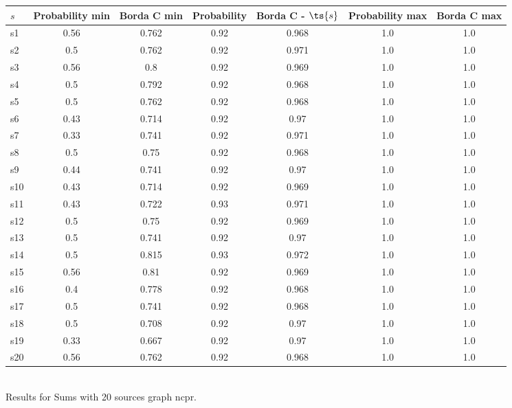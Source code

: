 \documentclass{article}
\begin{document}
\noindent\begin{tabular}{|l|c|c|c|c|c|c|}
\hline
$s$& Probability min & Borda C min & Probability & Borda C - $\ts{s}$ & Probability max & Borda C max\\
\hline
s1 &0.56 & 0.762 & 0.92 & 0.968 & 1.0 & 1.0\\
\hline
s2 &0.5 & 0.762 & 0.92 & 0.971 & 1.0 & 1.0\\
\hline
s3 &0.56 & 0.8 & 0.92 & 0.969 & 1.0 & 1.0\\
\hline
s4 &0.5 & 0.792 & 0.92 & 0.968 & 1.0 & 1.0\\
\hline
s5 &0.5 & 0.762 & 0.92 & 0.968 & 1.0 & 1.0\\
\hline
s6 &0.43 & 0.714 & 0.92 & 0.97 & 1.0 & 1.0\\
\hline
s7 &0.33 & 0.741 & 0.92 & 0.971 & 1.0 & 1.0\\
\hline
s8 &0.5 & 0.75 & 0.92 & 0.968 & 1.0 & 1.0\\
\hline
s9 &0.44 & 0.741 & 0.92 & 0.97 & 1.0 & 1.0\\
\hline
s10 &0.43 & 0.714 & 0.92 & 0.969 & 1.0 & 1.0\\
\hline
s11 &0.43 & 0.722 & 0.93 & 0.971 & 1.0 & 1.0\\
\hline
s12 &0.5 & 0.75 & 0.92 & 0.969 & 1.0 & 1.0\\
\hline
s13 &0.5 & 0.741 & 0.92 & 0.97 & 1.0 & 1.0\\
\hline
s14 &0.5 & 0.815 & 0.93 & 0.972 & 1.0 & 1.0\\
\hline
s15 &0.56 & 0.81 & 0.92 & 0.969 & 1.0 & 1.0\\
\hline
s16 &0.4 & 0.778 & 0.92 & 0.968 & 1.0 & 1.0\\
\hline
s17 &0.5 & 0.741 & 0.92 & 0.968 & 1.0 & 1.0\\
\hline
s18 &0.5 & 0.708 & 0.92 & 0.97 & 1.0 & 1.0\\
\hline
s19 &0.33 & 0.667 & 0.92 & 0.97 & 1.0 & 1.0\\
\hline
s20 &0.56 & 0.762 & 0.92 & 0.968 & 1.0 & 1.0\\
\hline
\end{tabular}\\

\noindent Results for Sums with 20 sources graph ncpr.
\end{document}
